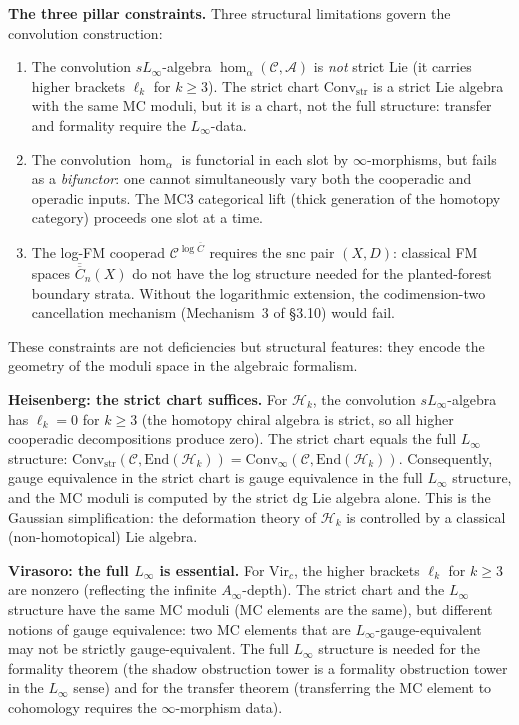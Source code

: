 \documentclass[11pt,reqno]{amsart}
\theoremstyle{definition}
\theoremstyle{remark}
\providecommand{\cA}{\mathcal{A}}
\providecommand{\cC}{\mathcal{C}}
\providecommand{\cH}{\mathcal{H}}
\providecommand{\FM}{\overline{C}}
\providecommand{\Vir}{\mathrm{Vir}}
\providecommand{\Convinf}{\mathrm{Conv}_\infty}
\providecommand{\Convstr}{\mathrm{Conv}_{\mathrm{str}}}
\providecommand{\End}{\mathrm{End}}
\numberwithin{equation}{section}
\begin{document}
\medskip
\noindent\textbf{The three pillar constraints.}\enspace
Three structural limitations govern the convolution construction:
\begin{enumerate}[label=(\roman*)]
\item The convolution $sL_\infty$-algebra
$\operatorname{hom}_\alpha(\cC,\cA)$ is \emph{not} strict Lie (it
carries higher brackets $\ell_k$ for $k\ge 3$). The strict chart
$\Convstr$ is a strict Lie algebra with the same MC moduli, but it
is a chart, not the full structure: transfer and formality require
the $L_\infty$-data.
\item The convolution $\operatorname{hom}_\alpha$ is functorial in
each slot by $\infty$-morphisms, but fails as a \emph{bifunctor}: one
cannot simultaneously vary both the cooperadic and operadic inputs.
The MC3 categorical lift (thick generation of the homotopy category)
proceeds one slot at a time.
\item The log-FM cooperad $\cC^{\log\FM}$ requires the snc pair
$(X,D)$: classical FM spaces $\overline{\FM}_n(X)$ do not have the
log structure needed for the planted-forest boundary strata. Without
the logarithmic extension, the codimension-two cancellation mechanism
(Mechanism~3 of \S3.10) would fail.
\end{enumerate}
These constraints are not deficiencies but structural features: they
encode the geometry of the moduli space in the algebraic formalism.

\medskip
\noindent\textbf{Heisenberg: the strict chart suffices.}\enspace
For $\cH_k$, the convolution $sL_\infty$-algebra has $\ell_k=0$ for
$k\ge 3$ (the homotopy chiral algebra is strict, so all higher
cooperadic decompositions produce zero). The strict chart equals the
full $L_\infty$ structure: $\Convstr(\cC,\End(\cH_k))=\Convinf(\cC,\End(\cH_k))$.
Consequently, gauge equivalence in the strict chart is gauge
equivalence in the full $L_\infty$ structure, and the MC moduli
is computed by the strict dg Lie algebra alone. This is the
Gaussian simplification: the deformation theory of $\cH_k$ is
controlled by a classical (non-homotopical) Lie algebra.

\medskip
\noindent\textbf{Virasoro: the full $L_\infty$ is essential.}\enspace
For $\Vir_c$, the higher brackets $\ell_k$ for $k\ge 3$ are nonzero
(reflecting the infinite $A_\infty$-depth). The strict chart and the
$L_\infty$ structure have the same MC moduli (MC elements are the
same), but different notions of gauge equivalence: two MC elements
that are $L_\infty$-gauge-equivalent may not be strictly gauge-equivalent.
The full $L_\infty$ structure is needed for the formality theorem
(the shadow obstruction tower is a formality obstruction tower in the
$L_\infty$ sense) and for the transfer theorem (transferring the MC
element to cohomology requires the $\infty$-morphism data).
\end{document}
